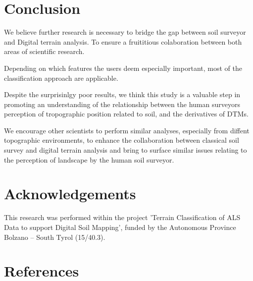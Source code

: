 \documentclass[preprint,12pt,authoryear]{elsarticle}
\begin{document}
\section{Conclusion}
We believe further research is necessary to bridge the gap between soil surveyor and Digital terrain analysis. To ensure a fruititious colaboration between both areas of scientific research.

Depending on which features the users deem especially important, most of the classification approach are applicable.

Despite the surprisinlgy poor results, we think this study is a valuable step in promoting an understanding of the relationship between the human surveyors perception of tropographic position related to soil, and the derivatives of DTMs. 

We encourage other scientists to perform similar analyses, especially from diffent topographic environments, to enhance the collaboration between classical soil survey and digital terrain analysis and bring to surface similar issues relating to the perception of landscape by the human soil surveyor.
\section*{Acknowledgements} This research was performed within the project 'Terrain Classification of ALS Data to support Digital Soil Mapping', funded by the Autonomous Province Bolzano -- South Tyrol (15/40.3).
\section*{References}

\end{document}
